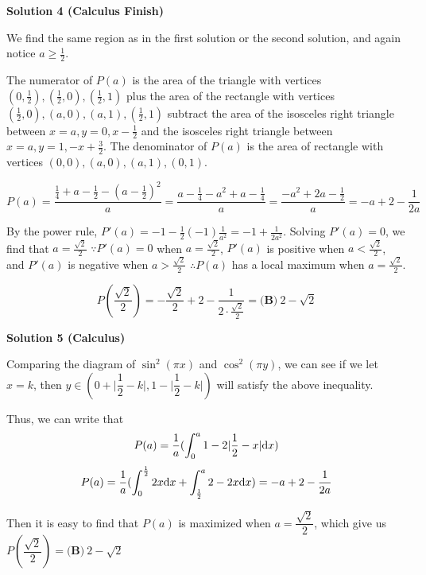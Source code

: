 \begin{enumerate}
 



\textbf{Solution 4 (Calculus Finish)}

We find the same region as in the first solution or the second solution, and again notice $a \geq \frac{1}{2}$. 

 The numerator of $P(a)$ is the area of the triangle with vertices $(0, \frac12), (\frac12, 0), (\frac12, 1)$ plus the area of the rectangle with vertices $(\frac12,0), (a,0), (a,1), (\frac12,1)$ subtract the area of the isosceles right triangle between $x=a, y=0,x - \frac{1}{2}$ and the isosceles right triangle between $x=a, y=1, -x + \frac{3}{2}$. The denominator of $P(a)$ is the area of rectangle with vertices $(0,0), (a,0), (a,1), (0,1)$.

 
 \[P(a) = \frac{ \frac14 + a - \frac12 -(a - \frac12)^2 }{a} = \frac{a - \frac14 -a^2 + a - \frac14 }{a} = \frac{-a^2 + 2a - \frac12 }{a} = -a + 2 - \frac{1}{2a}\]

 By the power rule, $P'(a) = -1 - \frac12(-1)\frac{1}{a^2} = -1 + \frac{1}{2a^2}$. Solving $P'(a) = 0$, we find that $a = \frac{ \sqrt{2} }{2}$
$\because P'(a) = 0$ when $a = \frac{ \sqrt{2} }{2}$, $P'(a)$ is positive when $a < \frac{ \sqrt{2} }{2}$, and $P'(a)$ is negative when $a > \frac{ \sqrt{2} }{2}$
$\therefore P(a)$ has a local maximum when $a = \frac{ \sqrt{2} }{2}$.

 
 \[P(\frac{ \sqrt{2} }{2}) = - \frac{\sqrt{2} }{2} + 2 - \frac{1}{2 \cdot  \frac{\sqrt{2} }{2}} =\boxed{\textbf{(B)}\ 2 - \sqrt{2}}\]




\textbf{Solution 5 (Calculus)}

Comparing the diagram of $\sin^{2}{(\pi x)}$ and $\cos^{2}{(\pi y)}$, we can see if we let $x=k$, then $y\in (0+\lvert \dfrac{1}{2}-k\rvert,1-\lvert\dfrac{1}{2}-k\rvert)$ will satisfy the above inequality.

 Thus, we can write that 
 \[P(a) = \frac{1}{a} (\int_0^{a}1-2\lvert\frac{1}{2}-x\rvert{\textrm d}x)\]
 \[P(a) = \frac{1}{a} (\int_0^{\frac{1}{2}}2x{\textrm d}x + \int_{\frac{1}{2}}^{a}2-2x{\textrm d}x) = -a+2-\frac{1}{2a}\]

 Then it is easy to find that $P(a)$ is maximized when $a=\dfrac{\sqrt{2}}{2}$, which give us $P(\dfrac{\sqrt{2}}{2})=\boxed{\textbf{(B)}\ 2 - \sqrt{2}}$



\end{enumerate}